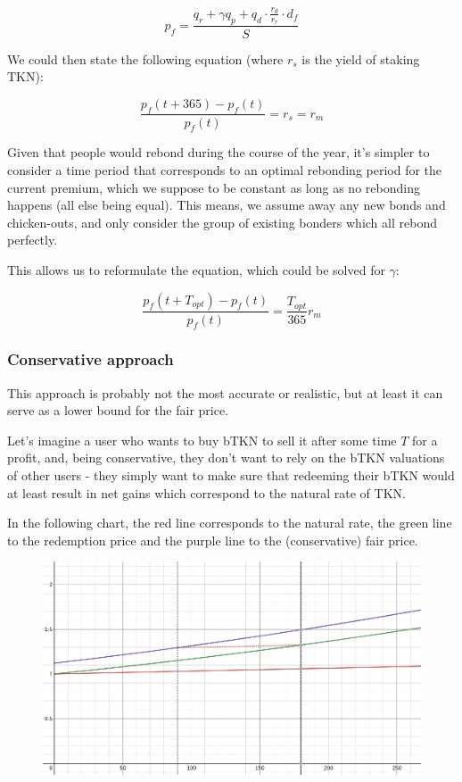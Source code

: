 \documentclass{article}
\begin{document}
\begin{equation}
  \label{eq:naive-beta}
   p_f = \frac{q_r + \gamma q_p + q_d \cdot \frac{r_d}{r_r} \cdot d_f}{S}
\end{equation}

We could then state the following equation (where $r_s$ is the yield of staking TKN):

\begin{equation}
  \label{eq:yield-eq}
  \frac{p_f(t + 365) - p_f(t)}{p_f(t)} = r_s = r_m 
\end{equation}

Given that people would rebond during the course of the year, it’s simpler to consider a time period that corresponds to an optimal rebonding period for the current premium, which we suppose to be constant as long as no rebonding happens (all else being equal). This means, we assume away any new bonds and chicken-outs, and only consider the group of existing bonders which all rebond perfectly.

This allows us to reformulate the equation, which could be solved for $\gamma$:

\begin{equation}
  \label{eq:yield-eq}
  \frac{p_f(t + T_{opt}) - p_f(t)}{p_f(t)} = \frac{T_{opt}}{365} r_m
\end{equation}

\subsubsection{Conservative approach}
This approach is probably not the most accurate or realistic, but at least it can serve as a lower bound for the fair price.

Let’s imagine a user who wants to buy bTKN to sell it after some time $T$ for a profit, and, being conservative, they don’t want to rely on the bTKN valuations of other users - they simply want to make sure that redeeming their bTKN would at least result in net gains which correspond to the natural rate of TKN.

In the following chart, the red line corresponds to the natural rate, the green line to the redemption price and the purple line to the (conservative) fair price.

\begin{figure}
    \centering
    \includegraphics[width=0.5\linewidth]{./ChickenBonds_Whitepaper_conservative_price.png}
\end{figure}
\end{document}
